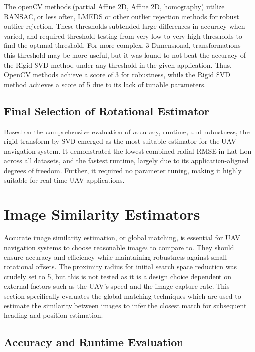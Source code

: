 The openCV methods (partial Affine 2D, Affine 2D, homography) utilize RANSAC, or less often, LMEDS or other outlier rejection methods for robust outlier rejection. These thresholds subtended large differences in accuracy when varied, and required threshold testing from very low to very high thresholds to find the optimal threshold. For more complex, 3-Dimensional, transformations this threshold may be more useful, but it was found to not beat the accuracy of the Rigid SVD method under any threshold in the given application. Thus, OpenCV methods achieve a score of 3 for robustness, while the Rigid SVD method achieves a score of 5 due to its lack of tunable parameters. 

\subsection{Final Selection of Rotational Estimator}

Based on the comprehensive evaluation of accuracy, runtime, and robustness, the rigid transform by SVD emerged as the most suitable estimator for the UAV navigation system. It demonstrated the lowest combined radial RMSE in Lat-Lon across all datasets, and the fastest runtime, largely due to its application-aligned degrees of freedom. Further, it required no parameter tuning, making it highly suitable for real-time UAV applications.





\section{Image Similarity Estimators}

Accurate image similarity estimation, or global matching, is essential for UAV navigation systems to choose reasonable images to compare to. They should ensure accuracy and efficiency while maintaining robustness against small rotational offsets. The proximity radius for initial search space reduction was crudely set to 5, but this is not tested as it is a design choice dependent on external factors such as the UAV's speed and the image capture rate. This section specifically evaluates the global matching techniques which are used to estimate the similarity between images to infer the closest match for subsequent heading and position estimation. 


\subsection{Accuracy and Runtime Evaluation}

